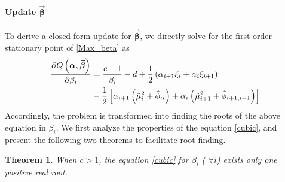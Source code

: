 \documentclass[lettersize,journal]{IEEEtran}
\newtheorem{theorem}{Theorem}
\theoremstyle{remark}
\begin{document}
\vspace{2mm}

\paragraph{Update $\vec{\boldsymbol{\beta}}$}
To derive a closed-form update for $\vec{\boldsymbol{\beta}}$, we directly solve for the first-order stationary point of \eqref{Max_beta} as
\begin{align}
	\frac{\partial Q\left(\boldsymbol{\alpha}, \vec{\boldsymbol{\beta}}\right)}{\partial \beta_{i}}&=\frac{c-1}{\beta_i}-d +\frac{1}{2} \left(\alpha_{i+1}\xi_i + \alpha_{i}\xi_{i+1} \right)\notag\\
	&-\frac{1}{2}\left[\alpha_{i+1}\left(\hat{\mu}_i^2+\hat{\phi}_{ii}\right)+\alpha_i \left(\hat{\mu}_{i+1}^2+\hat{\phi}_{i+1,i+1}\right)\right]\label{cubic} 
\end{align}
Accordingly, the problem is transformed into finding the roots of the above equation in $\beta_i$. We first analyze the properties of the equation \eqref{cubic}, and present the following two theorems to facilitate root-finding.

\begin{theorem}\label{Thm1}
	When \( c > 1 \), the equation \eqref{cubic} for \( \beta_i \) ( \(\forall  i \)) exists only one positive real root.
\end{theorem}
\end{document}

